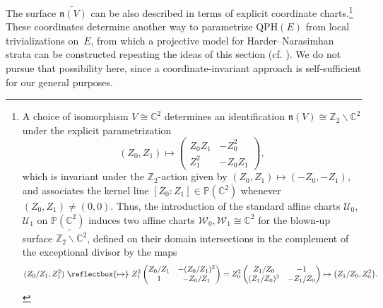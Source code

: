 \documentclass[pdftex]{sigma}
\newcommand{\field}[1]{\ensuremath{\mathbb{#1}}}
\newcommand{\CC}{\field{C}}
\newcommand{\PP}{\field{P}}
\newcommand{\ZZ}{\field{Z}}
\newcommand{\curly}[1]{\mathscr{#1}}
\newcommand{\cU}{\curly{U}}
\newcommand{\cW}{\curly{W}}
\numberwithin{equation}{section}
\begin{document}
\begin{Remark}%
The surface $\widetilde{\mathfrak{n}(V)}$ can be also described in terms of explicit coordinate charts.\footnote{A choice of isomorphism $V\cong \CC^{2}$ determines an identification $\mathfrak{n}(V)\cong \ZZ_{2}\backslash\CC^{2}$ under the explicit parametrization
\[
(Z_{0},Z_{1}) \mapsto \begin{pmatrix}
Z_{0}Z_{1} & -Z_{0}^{2}\\
Z_{1}^{2} & -Z_{0}Z_{1}
\end{pmatrix}\!,
\]
which is invariant under the $\ZZ_{2}$-action given by $(Z_{0},Z_{1})\mapsto (-Z_{0},-Z_{1})$, and associates the kernel line $[Z_{0} : Z_{1}]\in\PP(\CC^{2})$ whenever $(Z_{0},Z_{1})\neq(0,0)$. Thus, the introduction of the standard affine charts $\cU_{0}$, $\cU_{1}$ on $\PP(\CC^{2})$ induces two affine charts $\cW_{0},\cW_{1}\cong \CC^{2}$ for the blown-up surface $\widetilde{\ZZ_{2}\backslash\CC^{2}}$, defined on their domain intersections in the complement of the exceptional divisor by the maps
\[
(Z_{0}/Z_{1},Z_{1}^{2})\ \reflectbox{\ensuremath{\mapsto}} \
Z_{1}^{2}
\begin{pmatrix}
Z_{0}/Z_{1} & -(Z_{0}/Z_{1})^{2}\\
1 & -Z_{0}/Z_{1}
\end{pmatrix}
=Z_{0}^{2}\begin{pmatrix}
Z_{1}/Z_{0} & -1\\
(Z_{1}/Z_{0})^{2} & -Z_{1}/Z_{0}
\end{pmatrix}\mapsto \big(Z_{1}/Z_{0},Z_{0}^{2}\big).
\]
}
These coordinates determine another way to parametrize $\mathrm{QPH}(E)$ from local trivializations on~$E$, from which a projective model for Harder--Narasimhan strata can be constructed repeating the ideas of this section (cf. \cite{KS19}). We do not pursue that possibility here, since a coordinate-invariant approach is self-sufficient for our general purposes.
\end{Remark}
\end{document}
